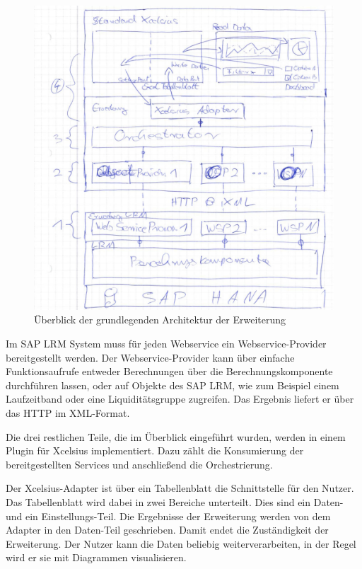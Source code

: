 \begin{onehalfspacing}
\begin{figure}[h]
\centering
\setlength{\unitlength}{1mm}
\includegraphics[width=15cm]{images/Ueberblick-Architektur.jpg}
\caption{Überblick der grundlegenden Architektur der Erweiterung\label{fig:ueberblick-architektur}}
\end{figure}

Im SAP LRM System muss für jeden Webservice ein Webservice-Provider bereitgestellt werden. Der Webservice-Provider kann über einfache Funktionsaufrufe entweder Berechnungen über die Berechnungskomponente durchführen lassen, oder auf Objekte des SAP LRM, wie zum Beispiel einem Laufzeitband oder eine Liquiditätsgruppe zugreifen. Das Ergebnis liefert er über das \gls{HTTP} im \gls{XML}-Format.

Die drei restlichen Teile, die im Überblick eingeführt wurden, werden in einem Plugin für Xcelsius implementiert. Dazu zählt die Konsumierung der bereitgestellten Services und anschließend die Orchestrierung.

Der Xcelsius-Adapter ist über ein Tabellenblatt die Schnittstelle für den Nutzer. Das Tabellenblatt wird dabei in zwei Bereiche unterteilt. Dies sind ein Daten- und ein Einstellungs-Teil. Die Ergebnisse der Erweiterung werden von dem Adapter in den Daten-Teil geschrieben. Damit endet die Zuständigkeit der Erweiterung. Der Nutzer kann die Daten beliebig weiterverarbeiten, in der Regel wird er sie mit Diagrammen visualisieren.


\end{onehalfspacing}
